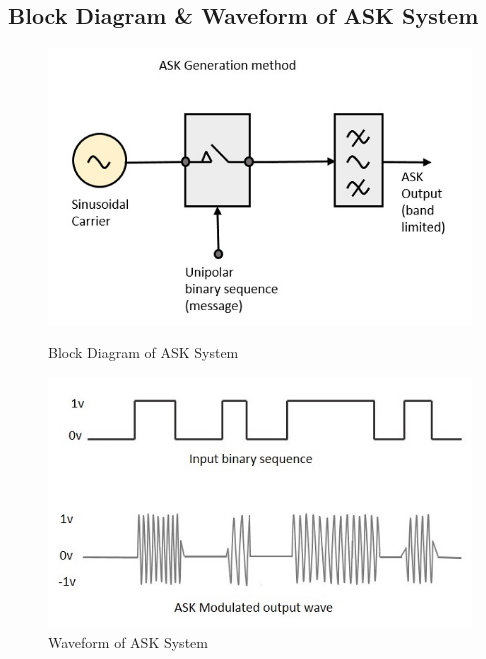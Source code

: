 \documentclass[12pt]{article}
\begin{document}
\subsection*{Block Diagram \& Waveform of ASK System}
\begin{figure}[H]
    \centering
    \begin{multicols}{2}
        \includegraphics[width=.95\linewidth]{ask_modulator.png}
        \caption{Block Diagram of ASK System}
        \label{fig:ask_modulator}

        \includegraphics[width=.95\linewidth]{ask_modulated_waveform.jpg}
        \caption{Waveform of ASK System}
        \label{fig:ask_waveform}
    \end{multicols}
\end{figure}
\end{document}
